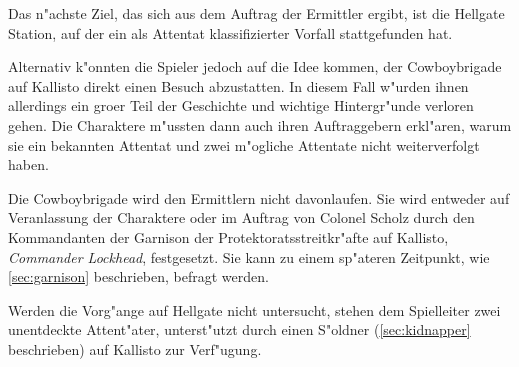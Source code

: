 
Das n"achste Ziel, das sich aus dem Auftrag der Ermittler ergibt, ist die Hellgate Station, auf der ein als Attentat klassifizierter Vorfall stattgefunden hat. 

Alternativ k"onnten die Spieler jedoch auf die Idee kommen, der Cowboybrigade auf Kallisto direkt einen Besuch abzustatten. In diesem Fall w"urden ihnen allerdings ein gro\3er Teil der Geschichte und wichtige Hintergr"unde verloren gehen. Die Charaktere m"ussten dann auch ihren Auftraggebern erkl"aren, warum sie ein bekannten Attentat und zwei m"ogliche Attentate nicht weiterverfolgt haben.

Die Cowboybrigade wird den Ermittlern nicht davonlaufen. Sie wird entweder auf Veranlassung der Charaktere oder im Auftrag von Colonel Scholz durch den Kommandanten der Garnison der Protektoratsstreitkr"afte auf Kallisto, \emph{Commander Lockhead}, festgesetzt. Sie kann zu einem sp"ateren Zeitpunkt, wie  \cref{sec:garnison} beschrieben, befragt werden.

Werden die Vorg"ange auf Hellgate nicht untersucht, stehen dem Spielleiter zwei unentdeckte Attent"ater, unterst"utzt durch einen S"oldner (\cref{sec:kidnapper} beschrieben) auf Kallisto zur Verf"ugung.
\vfill
